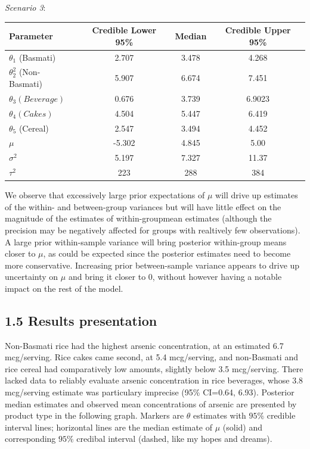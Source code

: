 \documentclass[]{article}
\begin{document}
\textit{Scenario 3}:

\begin{center}
  \begin{tabular}{l c c c}
  \hline Parameter & Credible Lower 95\% & Median & Credible Upper 95\% \\ \hline
    $\theta_1$ (Basmati)& 2.707 & 3.478 & 4.268\\
    $\theta_2^2$ (Non-Basmati)& 5.907 & 6.674 & 7.451 \\
    $\theta_3 (Beverage)$& 0.676 & 3.739 & 6.9023 \\
    $\theta_4 (Cakes)$& 4.504 & 5.447 & 6.419\\
    $\theta_5$ (Cereal)& 2.547 & 3.494 & 4.452\\
    $\mu$ &-5.302 & 4.845 & 5.00\\
    $\sigma^2$ &5.197 & 7.327 & 11.37\\
    $\tau^2$ &223 & 288 & 384\\ \hline
  \end{tabular}
\end{center}

We observe that excessively large prior expectations of \(\mu\) will
drive up estimates of the within- and between-group variances but will
have little effect on the magnitude of the estimates of within-groupmean
estimates (although the precision may be negatively affected for groups
with realtively few observations). A large prior within-sample variance
will bring posterior within-group means closer to \(\mu\), as could be
expected since the posterior estimates need to become more conservative.
Increasing prior between-sample variance appears to drive up uncertainty
on \(\mu\) and bring it closer to \(0\), without however having a
notable impact on the rest of the model.

\subsection{1.5 Results presentation}

Non-Basmati rice had the highest arsenic concentration, at an estimated
6.7 mcg/serving. Rice cakes came second, at 5.4 mcg/serving, and
non-Basmati and rice cereal had comparatively low amounts, slightly
below 3.5 mcg/serving. There lacked data to reliably evaluate arsenic
concentration in rice beverages, whose 3.8 mcg/serving estimate was
particulary imprecise (95\% CI=0.64, 6.93). Posterior median estimates
and observed mean concentrations of arsenic are presented by product
type in the following graph. Markers are \(\theta\) estimates with
\(95\%\) credible interval lines; horizontal lines are the median
estimate of \(\mu\) (solid) and corresponding \(95\%\) credibal interval
(dashed, like my hopes and dreams).
\end{document}
